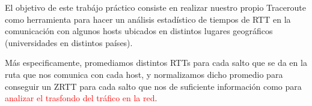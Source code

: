 El objetivo de este trab\'ajo pr\'actico consiste en realizar nuestro propio 
Traceroute como herramienta para hacer un an\'alisis estad\'istico de tiempos
de RTT en la comunicaci\'on con algunos hosts ubicados en distintos lugares
geográficos (universidades en distintos pa\'ises).

Más especificamente, promediamos distintos RTTs para cada salto que se da en 
la ruta que nos comunica con cada host, y normalizamos dicho promedio para 
conseguir un ZRTT para cada salto que nos de suficiente informaci\'on como para
\textcolor{red}{analizar el trasfondo del tr\'afico en la red}.
